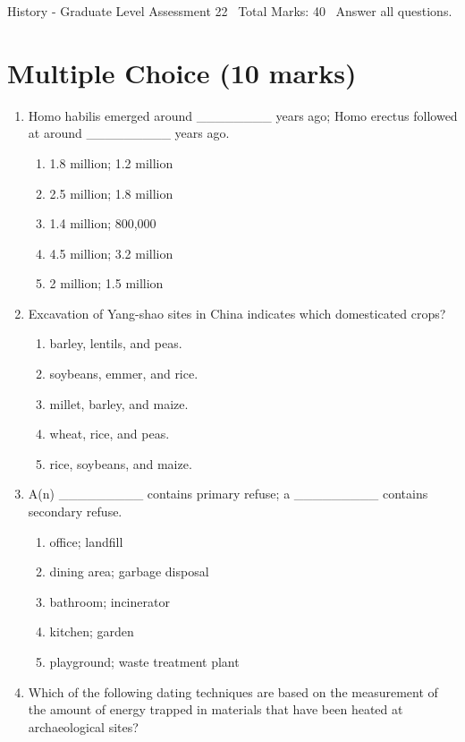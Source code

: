 \documentclass[12pt]{article}
\begin{document}
\begin{center}
History - Graduate Level Assessment 22 \
Total Marks: 40 \
Answer all questions.
\end{center}

\section*{Multiple Choice (10 marks)}
\begin{enumerate}[label=\arabic*.]
\item Homo habilis emerged around \_\_\_\_\_\_\_\_ years ago; Homo erectus followed at around \_\_\_\_\_\_\_\_\_ years ago.
\begin{enumerate}[label=(\alph*)]
    \item 1.8 million; 1.2 million
    \item 2.5 million; 1.8 million
    \item 1.4 million; 800,000
    \item 4.5 million; 3.2 million
    \item 2 million; 1.5 million
\end{enumerate}
\item Excavation of Yang-shao sites in China indicates which domesticated crops?
\begin{enumerate}[label=(\alph*)]
    \item barley, lentils, and peas.
    \item soybeans, emmer, and rice.
    \item millet, barley, and maize.
    \item wheat, rice, and peas.
    \item rice, soybeans, and maize.
\end{enumerate}
\item A(n) \_\_\_\_\_\_\_\_\_ contains primary refuse; a \_\_\_\_\_\_\_\_\_ contains secondary refuse.
\begin{enumerate}[label=(\alph*)]
    \item office; landfill
    \item dining area; garbage disposal
    \item bathroom; incinerator
    \item kitchen; garden
    \item playground; waste treatment plant
\end{enumerate}
\item Which of the following dating techniques are based on the measurement of the amount of energy trapped in materials that have been heated at archaeological sites?

\end{enumerate}
\end{document}
